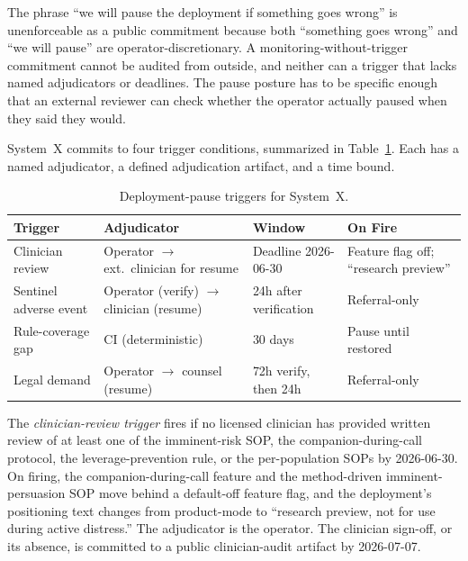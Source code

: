 \documentclass[letterpaper]{article} %
\begin{document}
The phrase ``we will pause the deployment if something goes wrong'' is unenforceable as a public commitment because both ``something goes wrong'' and ``we will pause'' are operator-discretionary. A monitoring-without-trigger commitment cannot be audited from outside, and neither can a trigger that lacks named adjudicators or deadlines. The pause posture has to be specific enough that an external reviewer can check whether the operator actually paused when they said they would.

System~X commits to four trigger conditions, summarized in Table~\ref{tab:triggers}. Each has a named adjudicator, a defined adjudication artifact, and a time bound.

\begin{table}[t]
\small
\centering
\caption{Deployment-pause triggers for System~X.}
\label{tab:triggers}
\begin{tabular}{@{}p{1.5cm}p{2.0cm}p{1.4cm}p{1.5cm}@{}}
\toprule
Trigger & Adjudicator & Window & On Fire \\
\midrule
Clinician review & Operator $\rightarrow$ ext.\ clinician for resume & Deadline 2026-06-30 & Feature flag off; ``research preview'' \\
Sentinel adverse event & Operator (verify) $\rightarrow$ clinician (resume) & 24h after verification & Referral-only \\
Rule-coverage gap & CI (deterministic) & 30 days & Pause until restored \\
Legal demand & Operator $\rightarrow$ counsel (resume) & 72h verify, then 24h & Referral-only \\
\bottomrule
\end{tabular}
\end{table}

The \emph{clinician-review trigger} fires if no licensed clinician has provided written review of at least one of the imminent-risk SOP, the companion-during-call protocol, the leverage-prevention rule, or the per-population SOPs by 2026-06-30. On firing, the companion-during-call feature and the method-driven imminent-persuasion SOP move behind a default-off feature flag, and the deployment's positioning text changes from product-mode to ``research preview, not for use during active distress.'' The adjudicator is the operator. The clinician sign-off, or its absence, is committed to a public clinician-audit artifact by 2026-07-07.
\end{document}
